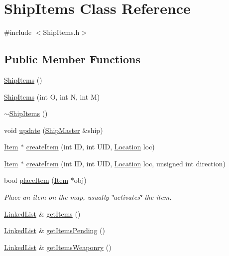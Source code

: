 \hypertarget{classShipItems}{\section{Ship\-Items Class Reference}
\label{classShipItems}
}


{\ttfamily \#include $<$Ship\-Items.\-h$>$}

\subsection*{Public Member Functions}
\begin{DoxyCompactItemize}
\item 
\hyperlink{classShipItems_adc14b59e747ba46333bdd33b864392c6}{Ship\-Items} ()
\item 
\hyperlink{classShipItems_ae0d1231017d6e1c4b586a8c0bc398af7}{Ship\-Items} (int O, int N, int M)
\item 
\hyperlink{classShipItems_a41194d8cb17bfaa10a5cd6abb80ba78b}{$\sim$\-Ship\-Items} ()
\item 
void \hyperlink{classShipItems_a3a5ab7ad8035ae1b3b6da0483f5ce792}{update} (\hyperlink{classShipMaster}{Ship\-Master} \&ship)
\item 
\hyperlink{classItem}{Item} $\ast$ \hyperlink{classShipItems_a49cdd4419f853d178c0cc1afd105121a}{create\-Item} (int I\-D, int U\-I\-D, \hyperlink{structLocation}{Location} loc)
\item 
\hyperlink{classItem}{Item} $\ast$ \hyperlink{classShipItems_a61bdf01e758998d328b172e241aa816a}{create\-Item} (int I\-D, int U\-I\-D, \hyperlink{structLocation}{Location} loc, unsigned int direction)
\item 
bool \hyperlink{classShipItems_a838f560346a9d7b0f1bb128aaf93b1c7}{place\-Item} (\hyperlink{classItem}{Item} $\ast$obj)
\begin{DoxyCompactList}\small\item\em Place an item on the map, usually \char`\"{}activates\char`\"{} the item. \end{DoxyCompactList}\item 
\hyperlink{classLinkedList}{Linked\-List} \& \hyperlink{classShipItems_adf57cc0e0699cb38bdb29e8d45b1243d}{get\-Items} ()
\item 
\hyperlink{classLinkedList}{Linked\-List} \& \hyperlink{classShipItems_ac77750d78a0d268e330940a73961238f}{get\-Items\-Pending} ()
\item 
\hyperlink{classLinkedList}{Linked\-List} \& \hyperlink{classShipItems_a00f9e60d91680092094a012aa9bc7fc6}{get\-Items\-Weaponry} ()

\end{DoxyCompactItemize}
